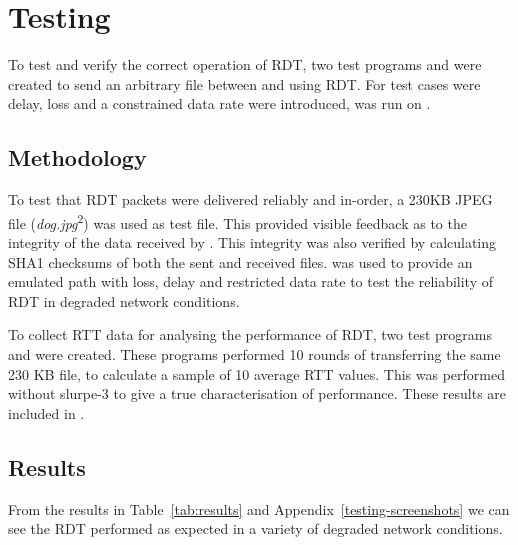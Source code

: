 \section{Testing}

To test and verify the correct operation of RDT, two test programs  and  were created to send an arbitrary file between  and  using RDT. For test cases were delay, loss and a constrained data rate were introduced,  was run on .

\subsection{Methodology}

To test that RDT packets were delivered reliably and in-order, a 230KB JPEG file (\emph{dog.jpg}\textsuperscript{2}) was used as test file. This provided visible feedback as to the integrity of the data received by . This integrity was also verified by calculating SHA1 checksums of both the sent and received files.  was used to provide an emulated path with loss, delay and restricted data rate to test the reliability of RDT in degraded network conditions.

To collect RTT data for analysing the performance of RDT, two test programs  and  were created. These programs performed 10 rounds of transferring the same 230 KB file, to calculate a sample of 10 average RTT values. This was performed without slurpe-3 to give a true characterisation of performance. These results are included in .

\subsection{Results}

From the results in Table~\ref{tab:results} and Appendix~\ref{testing-screenshots} we can see the RDT performed as expected in a variety of degraded network conditions. 

